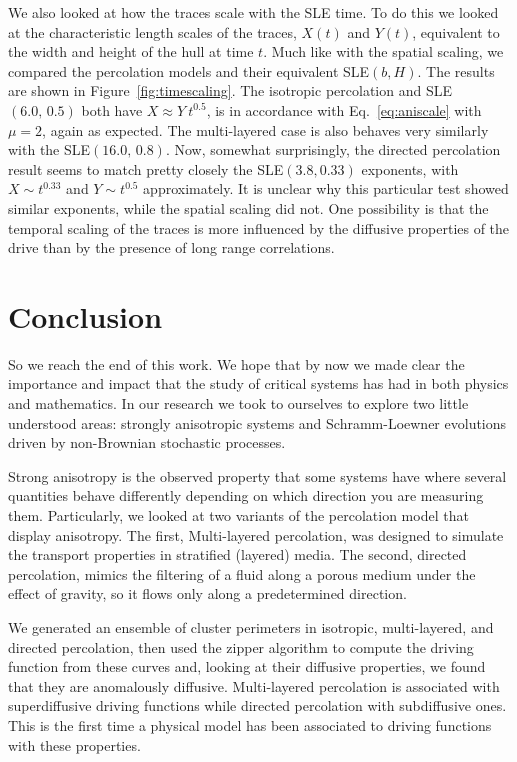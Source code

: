 We also looked at how the traces scale with the SLE time. To do this we looked
at the characteristic length scales of the traces, $X(t)$ and $Y(t)$,
equivalent to the width and height of the hull at time $t$. Much like with the
spatial scaling, we compared the percolation models and their equivalent
SLE$(b,H)$. The results are shown in Figure~\ref{fig:timescaling}. The
isotropic percolation and SLE$(6.0,\, 0.5)$ both have $X\approx Y~t^{0.5}$, is
in accordance with Eq.~\ref{eq:aniscale} with $\mu=2$, again as expected. The
multi-layered case is also behaves very similarly with the SLE$(16.0,\,0.8)$.
Now, somewhat surprisingly, the directed percolation result seems to match
pretty closely the SLE$(3.8, 0.33)$ exponents, with $X\sim t^{0.33}$ and
$Y\sim t^{0.5}$ approximately. It is unclear why this particular test showed
similar exponents, while the spatial scaling did not. One possibility is that
the temporal scaling of the traces is more influenced by the diffusive
properties of the drive than by the presence of long range correlations.


\chapter{Conclusion}
\label{sec:concl}

So we reach the end of this work. We hope that by now we made clear the
importance and impact that the study of critical systems has had in both
physics and mathematics. In our research we took to ourselves to explore two
little understood areas: strongly anisotropic systems and Schramm-Loewner
evolutions driven by non-Brownian stochastic processes.

Strong anisotropy is the observed property that some systems have where several
quantities behave differently depending on which direction you are measuring
them. Particularly, we looked at two variants of the percolation model that
display anisotropy. The first, Multi-layered percolation, was designed to
simulate the transport properties in stratified (layered) media. The second,
directed percolation, mimics the filtering of a fluid along a porous medium
under the effect of gravity, so it flows only along a predetermined direction.

We generated an ensemble of cluster perimeters in isotropic, multi-layered, and
directed percolation, then used the zipper algorithm to compute the driving
function from these curves and, looking at their diffusive properties, we found
that they are anomalously diffusive. Multi-layered percolation is associated
with superdiffusive driving functions while directed percolation with
subdiffusive ones. This is the first time a physical model has been associated
to driving functions with these properties.

